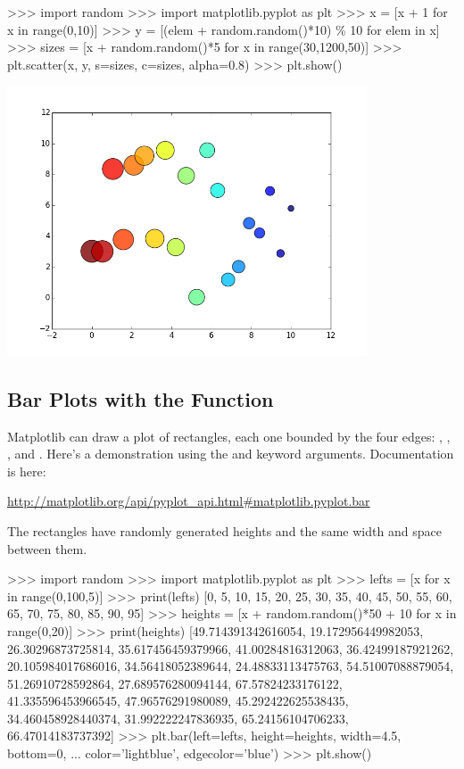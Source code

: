 \documentclass[11pt]{cselabheader}
\begin{document}
\begin{pyconcode}
>>> import random
>>> import matplotlib.pyplot as plt
>>> x = [x + 1 for x in range(0,10)]
>>> y = [(elem + random.random()*10) \% 10 for elem in x]
>>> sizes = [x + random.random()*5 for x in range(30,1200,50)]
>>> plt.scatter(x, y, s=sizes, c=sizes, alpha=0.8)
>>> plt.show()
\end{pyconcode}

\begin{center}
\includegraphics[width=0.8\textwidth]{img/matplotlib_scatter.png}
\end{center}

\subsection{Bar Plots with the  Function}

Matplotlib can draw a plot of rectangles, each one bounded by the four edges:
, , , and
. Here's a demonstration using the
 and  keyword arguments.
Documentation is here:

\begin{center}
\url{http://matplotlib.org/api/pyplot_api.html#matplotlib.pyplot.bar}
\end{center}


The rectangles have randomly generated heights and the same width and space
between them.

\begin{pyconcode}
>>> import random
>>> import matplotlib.pyplot as plt
>>> lefts = [x for x in range(0,100,5)]
>>> print(lefts)
[0, 5, 10, 15, 20, 25, 30, 35, 40, 45, 50, 55, 60, 65, 70, 75, 80, 85, 90, 95]
>>> heights = [x + random.random()*50 + 10 for x in range(0,20)]
>>> print(heights)
[49.714391342616054, 19.172956449982053, 26.30296873725814, 35.617456459379966,
 41.00284816312063, 36.42499187921262, 20.105984017686016, 34.56418052389644,
 24.48833113475763, 54.51007088879054, 51.26910728592864, 27.689576280094144,
 67.57824233176122, 41.335596453966545, 47.96576291980089, 45.292422625538435,
 34.460458928440374, 31.992222247836935, 65.24156104706233, 66.47014183737392]
>>> plt.bar(left=lefts, height=heights, width=4.5, bottom=0,
...         color='lightblue', edgecolor='blue')
>>> plt.show()
\end{pyconcode}
\end{document}
